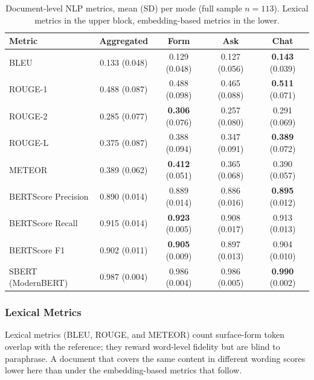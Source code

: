 \begin{table}[htbp]
\centering
\small
\begin{tabular}{@{}l c c c c@{}}
\toprule
Metric & Aggregated & Form & Ask & Chat \\
\midrule
BLEU                & 0.133 (0.048) & 0.129 (0.048) & 0.127 (0.056) & \textbf{0.143} (0.039) \\
ROUGE-1             & 0.488 (0.087) & 0.488 (0.098) & 0.465 (0.088) & \textbf{0.511} (0.071) \\
ROUGE-2             & 0.285 (0.077) & \textbf{0.306} (0.076) & 0.257 (0.080) & 0.291 (0.069) \\
ROUGE-L             & 0.375 (0.087) & 0.388 (0.094) & 0.347 (0.091) & \textbf{0.389} (0.072) \\
METEOR              & 0.389 (0.062) & \textbf{0.412} (0.051) & 0.365 (0.068) & 0.390 (0.057) \\
\midrule
BERTScore Precision & 0.890 (0.014) & 0.889 (0.014) & 0.886 (0.016) & \textbf{0.895} (0.012) \\
BERTScore Recall    & 0.915 (0.014) & \textbf{0.923} (0.005) & 0.908 (0.017) & 0.913 (0.013) \\
BERTScore F1        & 0.902 (0.011) & \textbf{0.905} (0.009) & 0.897 (0.013) & 0.904 (0.010) \\
SBERT (ModernBERT)  & 0.987 (0.004) & 0.986 (0.004) & 0.986 (0.005) & \textbf{0.990} (0.002) \\
\bottomrule
\end{tabular}
\caption{Document-level NLP metrics, mean (SD) per mode (full
sample $n = 113$). Lexical metrics in the upper block,
embedding-based metrics in the lower.}
\label{tab:nlp-doc-overview}
\end{table}

\subsubsection{Lexical Metrics}
\label{ssec:nlp-doc-lexical}

Lexical metrics (BLEU, ROUGE, and METEOR) count surface-form token
overlap with the reference; they reward word-level fidelity but
are blind to paraphrase. A document that covers the same content
in different wording scores lower here than under the
embedding-based metrics that follow.


